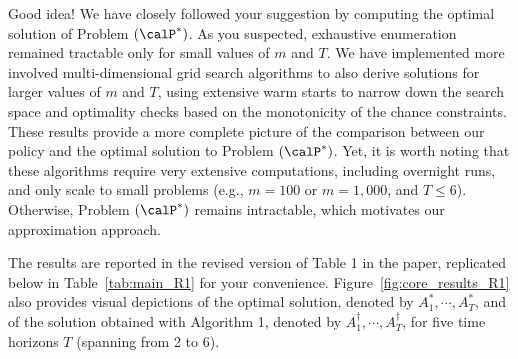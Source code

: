 \documentclass[11pt]{article}
\begin{document}
Good idea! We have closely followed your suggestion by computing the optimal solution of Problem $(\calP^*)$. As you suspected, exhaustive enumeration remained tractable only for small values of $m$ and $T$. We have implemented more involved multi-dimensional grid search algorithms to also derive solutions for larger values of $m$ and $T$, using extensive warm starts to narrow down the search space and optimality checks based on the monotonicity of the chance constraints. These results provide a more complete picture of the comparison between our policy and the optimal solution to Problem $(\calP^*)$. Yet, it is worth noting that these algorithms require very extensive computations, including overnight runs, and only scale to small problems (e.g., $m=100$ or $m=1,000$, and $T\leq6$). Otherwise, Problem $(\calP^*)$ remains intractable, which motivates our approximation approach.

The results are reported in the revised version of Table 1 in the paper, replicated below in Table~\ref{tab:main_R1} for your convenience. Figure~\ref{fig:core_results_R1} also provides visual depictions of the optimal solution, denoted by $A^*_1,\cdots,A^*_T$, and of the solution obtained with Algorithm 1, denoted by $A^\dagger_1,\cdots,A^\dagger_T$, for five time horizons $T$ (spanning from 2 to 6).
\end{document}

